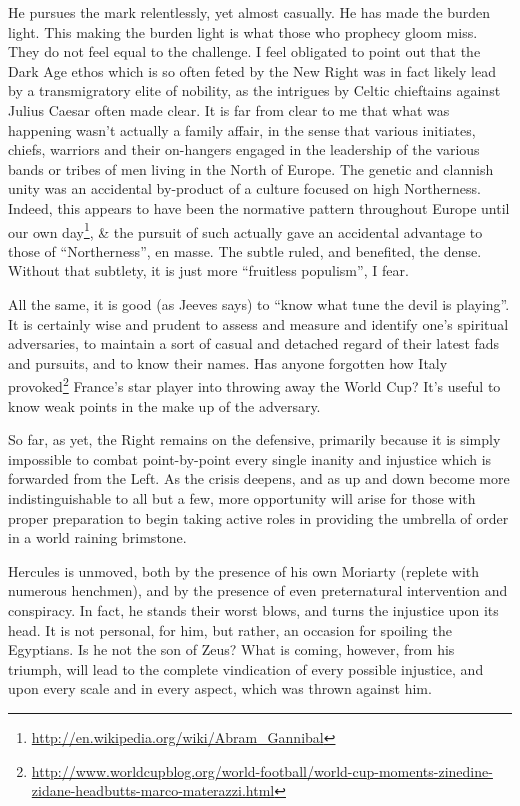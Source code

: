 He pursues the mark relentlessly, yet almost casually. He has made the burden light. This making the burden light is what those who prophecy gloom miss. They do not feel equal to the challenge. I feel obligated to point out that the Dark Age ethos which is so often feted by the New Right was in fact likely lead by a transmigratory elite of nobility, as the intrigues by Celtic chieftains against Julius Caesar often made clear. It is far from clear to me that what was happening wasn't actually a family affair, in the sense that various initiates, chiefs, warriors and their on-hangers engaged in the leadership of the various bands or tribes of men living in the North of Europe. The genetic and clannish unity was an accidental by-product of a culture focused on high Northerness. Indeed, this appears to have been the normative pattern throughout Europe until our own day\footnote{\url{http://en.wikipedia.org/wiki/Abram\_Gannibal}}, \& the pursuit of such actually gave an accidental advantage to those of ``Northerness'', en masse. The subtle ruled, and benefited, the dense. Without that subtlety, it is just more ``fruitless populism'', I fear.

All the same, it is good (as Jeeves says) to ``know what tune the devil is playing''. It is certainly wise and prudent to assess and measure and identify one's spiritual adversaries, to maintain a sort of casual and detached regard of their latest fads and pursuits, and to know their names. Has anyone forgotten how Italy provoked\footnote{\url{http://www.worldcupblog.org/world-football/world-cup-moments-zinedine-zidane-headbutts-marco-materazzi.html}} France's star player into throwing away the World Cup? It's useful to know weak points in the make up of the adversary.

So far, as yet, the Right remains on the defensive, primarily because it is simply impossible to combat point-by-point every single inanity and injustice which is forwarded from the Left. As the crisis deepens, and as up and down become more indistinguishable to all but a few, more opportunity will arise for those with proper preparation to begin taking active roles in providing the umbrella of order in a world raining brimstone.

Hercules is unmoved, both by the presence of his own Moriarty (replete with numerous henchmen), and by the presence of even preternatural intervention and conspiracy. In fact, he stands their worst blows, and turns the injustice upon its head. It is not personal, for him, but rather, an occasion for spoiling the Egyptians. Is he not the son of Zeus? What is coming, however, from his triumph, will lead to the complete vindication of every possible injustice, and upon every scale and in every aspect, which was thrown against him.

